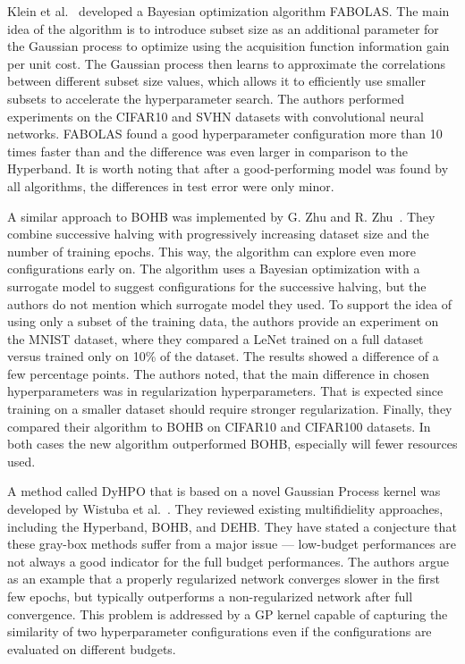 Klein et al.~\cite{klein2017fast} developed a Bayesian optimization algorithm FABOLAS. The main idea of the algorithm is to introduce subset size as an additional parameter for the Gaussian process to optimize using the acquisition function information gain per unit cost. The Gaussian process then learns to approximate the correlations between different subset size values, which allows it to efficiently use smaller subsets to accelerate the hyperparameter search. The authors performed experiments on the CIFAR10 and SVHN datasets with convolutional neural networks. FABOLAS found a good hyperparameter configuration more than 10 times faster than  and the difference was even larger in comparison to the Hyperband. It is worth noting that after a good-performing model was found by all algorithms, the differences in test error were only minor.

A similar approach to BOHB was implemented by G. Zhu and R. Zhu~\cite{zhu2020accelerating}. They combine successive halving with progressively increasing dataset size and the number of training epochs. This way, the algorithm can explore even more configurations early on. The algorithm uses a Bayesian optimization with a surrogate model to suggest configurations for the successive halving, but the authors do not mention which surrogate model they used. To support the idea of using only a subset of the training data, the authors provide an experiment on the MNIST dataset, where they compared a LeNet trained on a full dataset versus trained only on 10\% of the dataset. The results showed a difference of a few percentage points. The authors noted, that the main difference in chosen hyperparameters was in regularization hyperparameters. That is expected since training on a smaller dataset should require stronger regularization. Finally, they compared their algorithm to BOHB on CIFAR10 and CIFAR100 datasets. In both cases the new algorithm outperformed BOHB, especially will fewer resources used.



A method called DyHPO that is based on a novel Gaussian Process kernel was developed by Wistuba et al.~\cite{wistuba2022supervising}. They reviewed existing multifidielity approaches, including the Hyperband, BOHB, and DEHB. They have stated a conjecture that these gray-box methods suffer from a major issue --- low-budget performances are not always a good indicator for the full budget performances. The authors argue as an example that a properly regularized network converges slower in the first few epochs, but typically outperforms a non-regularized network after full convergence. This problem is addressed by a GP kernel capable of capturing the similarity of two hyperparameter configurations even if the configurations are evaluated on different budgets.

